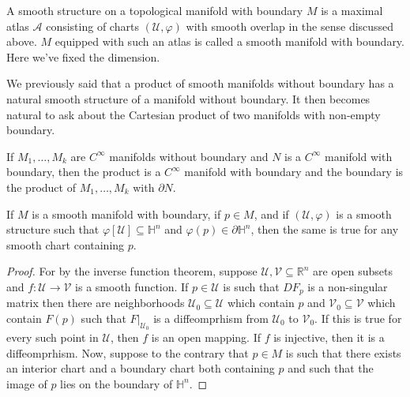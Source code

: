 \documentclass{article}                                                        %
\begin{document}
        \begin{definition}
            A smooth structure on a topological manifold with boundary $M$ is a
            maximal atlas $\mathcal{A}$ consisting of charts
            $(\mathcal{U},\varphi)$ with smooth overlap in the sense discussed
            above. $M$ equipped with such an atlas is called a smooth manifold
            with boundary. Here we've fixed the dimension.
        \end{definition}
        We previously said that a product of smooth manifolds without boundary
        has a natural smooth structure of a manifold without boundary. It then
        becomes natural to ask about the Cartesian product of two manifolds
        with non-empty boundary.\
        \begin{theorem}
            If $M_{1},\dots,M_{k}$ are $C^{\infty}$ manifolds without boundary
            and $N$ is a $C^{\infty}$ manifold with boundary, then the product
            is a $C^{\infty}$ manifold with boundary and the boundary is
            the product of $M_{1},\dots,M_{k}$ with $\partial{N}$.
        \end{theorem}
        \begin{theorem}
            If $M$ is a smooth manifold with boundary, if $p\in{M}$, and if
            $(\mathcal{U},\varphi)$ is a smooth structure such that
            $\varphi[\mathcal{U}]\subseteq\mathbb{H}^{n}$ and
            $\varphi(p)\in\partial\mathbb{H}^{n}$, then the same is true for any
            smooth chart containing $p$.
        \end{theorem}
        \begin{proof}
            For by the inverse function theorem, suppose
            $\mathcal{U},\mathcal{V}\subseteq\mathbb{R}^{n}$ are open subsets
            and $f:\mathcal{U}\rightarrow\mathcal{V}$ is a smooth function. If
            $p\in\mathcal{U}$ is such that $DF_{p}$ is a non-singular matrix
            then there are neighborhoods $\mathcal{U}_{0}\subseteq\mathcal{U}$
            which contain $p$ and $\mathcal{V}_{0}\subseteq\mathcal{V}$ which
            contain $F(p)$ such that $F|_{\mathcal{U}_{0}}$ is a diffeomprhism
            from $\mathcal{U}_{0}$ to $\mathcal{V}_{0}$. If this is true for
            every such point in $\mathcal{U}$, then $f$ is an open mapping. If
            $f$ is injective, then it is a diffeomprhism. Now, suppose to the
            contrary that $p\in{M}$ is such that there exists an interior chart
            and a boundary chart both containing $p$ and such that the image
            of $p$ lies on the boundary of $\mathbb{H}^{n}$.
        \end{proof}
\end{document}

